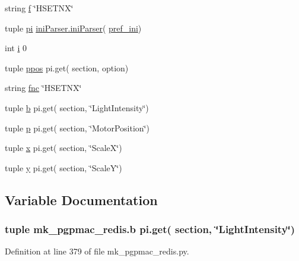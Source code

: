 \begin{DoxyCompactItemize}
string \hyperlink{namespacemk__pgpmac__redis_a057fe7457503e0de97edcf855591ed58}{f} \char`\"{}H\-S\-E\-T\-N\-X\char`\"{}
\item 
tuple \hyperlink{namespacemk__pgpmac__redis_a2f5bbda0250eecd94d166dc0a2fbff86}{pi} \hyperlink{classiniParser_1_1iniParser}{ini\-Parser.\-ini\-Parser}( \hyperlink{namespacemk__pgpmac__redis_a38c785af5201403976e1267c47ea5096}{pref\-\_\-ini})
\item 
int \hyperlink{namespacemk__pgpmac__redis_afa643a23a5984fe44c2182ada3dfa401}{i} 0
\item 
tuple \hyperlink{namespacemk__pgpmac__redis_aadd7321b8f7efe139c3e92e51cd34c00}{ppos} pi.\-get( section, option)
\item 
string \hyperlink{namespacemk__pgpmac__redis_a654b54ba0758b8b84516938260851129}{fnc} \char`\"{}H\-S\-E\-T\-N\-X\char`\"{}
\item 
tuple \hyperlink{namespacemk__pgpmac__redis_a90faa2042277e396b48b19374c9db4ab}{b} pi.\-get( section, \char`\"{}Light\-Intensity\char`\"{})
\item 
tuple \hyperlink{namespacemk__pgpmac__redis_a11daf2847f2dc94562b5b61b3f412574}{p} pi.\-get( section, \char`\"{}Motor\-Position\char`\"{})
\item 
tuple \hyperlink{namespacemk__pgpmac__redis_abc8696f6f2f3fd3edd30989d3c8ec301}{x} pi.\-get( section, \char`\"{}Scale\-X\char`\"{})
\item 
tuple \hyperlink{namespacemk__pgpmac__redis_a34220d58136fb95853f54ed51a130f79}{y} pi.\-get( section, \char`\"{}Scale\-Y\char`\"{})
\end{DoxyCompactItemize}


\subsection{Variable Documentation}
\hypertarget{namespacemk__pgpmac__redis_a90faa2042277e396b48b19374c9db4ab}{
\subsubsection[{b}]{\setlength{\rightskip}{0pt plus 5cm}tuple mk\-\_\-pgpmac\-\_\-redis.\-b pi.\-get( section, \char`\"{}Light\-Intensity\char`\"{})}}\label{namespacemk__pgpmac__redis_a90faa2042277e396b48b19374c9db4ab}


Definition at line 379 of file mk\-\_\-pgpmac\-\_\-redis.\-py.

